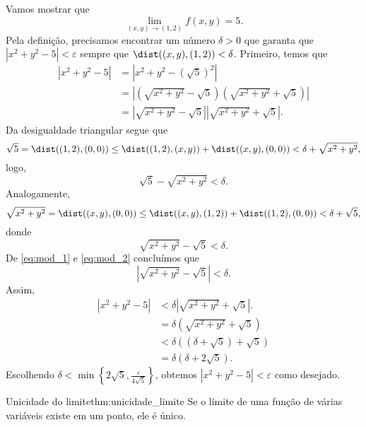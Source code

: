 \begin{example}{}{}
Vamos mostrar que 
\[\lim\limits_{{(x, y) \to (1, 2)}} f(x, y)
= 5.\]
Pela definição, precisamos encontrar um número $\delta>0$ que garanta que \(|x^2+y^2 - 5| < \varepsilon\) sempre que 
$\dist((x,y),(1,2))<\delta$. 
Primeiro, temos que
\begin{align*}
    |x^2+y^2 - 5|&=|x^2+y^2 - (\sqrt{5})^2|\\
    &= |(\sqrt{x^2+y^2} - \sqrt{5})(\sqrt{x^2+y^2} + \sqrt{5})|\\
    &= |\sqrt{x^2+y^2} - \sqrt{5}||\sqrt{x^2+y^2} + \sqrt{5}|. 
\end{align*}
Da desigualdade triangular segue que 
$$\sqrt{5}=\dist((1,2),(0,0))\leq \dist((1,2),(x,y))+\dist((x,y),(0,0))<\delta + \sqrt{x^2+y^2},$$
logo, 
\begin{equation}\label{eq:mod_1}
    \sqrt{5}-\sqrt{x^2+y^2}<\delta.
\end{equation}
Analogamente, 
$$\sqrt{x^2+y^2}=\dist((x,y),(0,0))\leq \dist((x,y),(1,2))+\dist((1,2),(0,0))<\delta+\sqrt{5},$$
donde
\begin{equation}\label{eq:mod_2}
\sqrt{x^2+y^2}-\sqrt{5}<\delta.
\end{equation}
De \eqref{eq:mod_1} e \eqref{eq:mod_2} concluímos que
$$|\sqrt{x^2+y^2}-\sqrt{5}|<\delta.$$
Assim, 
\begin{align*}
    |x^2+y^2 - 5|& < \delta|\sqrt{x^2+y^2} + \sqrt{5}|. \\
    &=\delta(\sqrt{x^2+y^2} + \sqrt{5})\\
    &<\delta((\delta+\sqrt{5})+\sqrt{5})\\
    &=\delta(\delta+2\sqrt{5}).
\end{align*}
Escolhendo $\delta<\min\left\{2\sqrt{5},\frac{\varepsilon}{4\sqrt{5}}\right\}$, obtemos $|x^2+y^2 - 5|<\varepsilon$ 
como desejado. 
\end{example}

\begin{theorem}{Unicidade do limite}{thm:unicidade_limite}
Se o limite de uma função de várias variáveis existe em um ponto, ele é único.   
\end{theorem}

